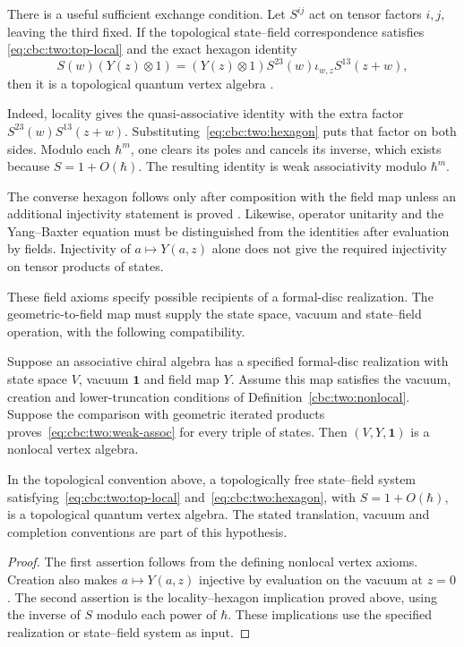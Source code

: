 There is a useful sufficient exchange condition.
Let $S^{ij}$ act on tensor factors $i,j$, leaving the third fixed.
If the topological state--field correspondence satisfies
\eqref{eq:cbc:two:top-local} and the exact hexagon identity
\begin{equation}
 S(w)(Y(z)\otimes1)
  =(Y(z)\otimes1)S^{23}(w)\iota_{w,z}S^{13}(z+w),
 \label{eq:cbc:two:hexagon}
\end{equation}
then it is a topological quantum vertex algebra
\cite[Propositions 3.8 and 3.13]{DSGKQVA}.

Indeed, locality gives the quasi-associative identity with the
extra factor $S^{23}(w)S^{13}(z+w)$.
Substituting~\eqref{eq:cbc:two:hexagon} puts that factor on both
sides. Modulo each $\hbar^m$, one clears its poles and cancels its
inverse, which exists because $S=1+O(\hbar)$.
The resulting identity is weak associativity modulo $\hbar^m$.

The converse hexagon follows only after composition with the field
map unless an additional injectivity statement is proved
\cite[Proposition 3.14]{DSGKQVA}.
Likewise, operator unitarity and the Yang--Baxter equation must be
distinguished from the identities after evaluation by fields.
Injectivity of $a\mapsto Y(a,z)$ alone does not give the required
injectivity on tensor products of states.

These field axioms specify possible recipients of a formal-disc realization.
The geometric-to-field map must supply the state space, vacuum and state--field operation, with the following compatibility.

\begin{proposition}
\label{cbc:two:field-realization}
Suppose an associative chiral algebra has a specified formal-disc realization with state space $V$, vacuum $\mathbf1$ and field map $Y$.
Assume this map satisfies the vacuum, creation and lower-truncation conditions of Definition~\ref{cbc:two:nonlocal}.
Suppose the comparison with geometric iterated products proves~\eqref{eq:cbc:two:weak-assoc} for every triple of states.
Then $(V,Y,\mathbf1)$ is a nonlocal vertex algebra.

In the topological convention above, a topologically free state--field system satisfying~\eqref{eq:cbc:two:top-local} and~\eqref{eq:cbc:two:hexagon}, with $S=1+O(\hbar)$, is a topological quantum vertex algebra.
The stated translation, vacuum and completion conventions are part of this hypothesis.
\end{proposition}
\begin{proof}
The first assertion follows from the defining nonlocal vertex axioms.
Creation also makes $a\mapsto Y(a,z)$ injective by evaluation on the vacuum at $z=0$.
The second assertion is the locality--hexagon implication proved above, using the inverse of $S$ modulo each power of $\hbar$.
These implications use the specified realization or state--field system as input.
\end{proof}

